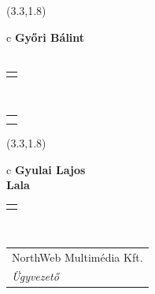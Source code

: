 \documentclass[11pt]{article}
\begin{document}
\makebox(3.3,1.8){
  \renewcommand\arraystretch{1.3}
  \begin{tabular}[c]{c}
    \hspace{8.5mm}
    \LARGE\bf{ Győri Bálint }\\
    \hspace{8.5mm}
    \Large{  }\\
    \renewcommand\arraystretch{3}
    \begin{tabular}[c]{c}
      \centering
      \fontfamily{phv}\selectfont{
        \textbf{
          \textsc{
            \scriptsize{
            \color{Dark}{ Ismerkedő }\color{Bright}{ Webmester }\color{Bright}{ Sminkmester }\color{Bright}{ Programozó }
            }
          }
        }
      }
    \end{tabular}
    \\
    \renewcommand\arraystretch{1}
    \begin{tabular}{p{3.3in}}
      \hspace{.7cm}\\
      \hspace{.7cm}\emph{  }\\
    \end{tabular}
  \end{tabular}
}

\makebox(3.3,1.8){
  \renewcommand\arraystretch{1.3}
  \begin{tabular}[c]{c}
    \hspace{8.5mm}
    \LARGE\bf{ Gyulai Lajos }\\
    \hspace{8.5mm}
    \Large{ Lala }\\
    \renewcommand\arraystretch{3}
    \begin{tabular}[c]{c}
      \centering
      \fontfamily{phv}\selectfont{
        \textbf{
          \textsc{
            \scriptsize{
            \color{Dark}{ Ismerkedő }\color{Bright}{ Webmester }\color{Bright}{ Sminkmester }\color{Bright}{ Programozó }
            }
          }
        }
      }
    \end{tabular}
    \\
    \renewcommand\arraystretch{1}
    \begin{tabular}{p{3.3in}}
      \hspace{.7cm}NorthWeb Multimédia Kft.\\
      \hspace{.7cm}\emph{ Ügyvezető }\\
    \end{tabular}
  \end{tabular}
}
\end{document}
